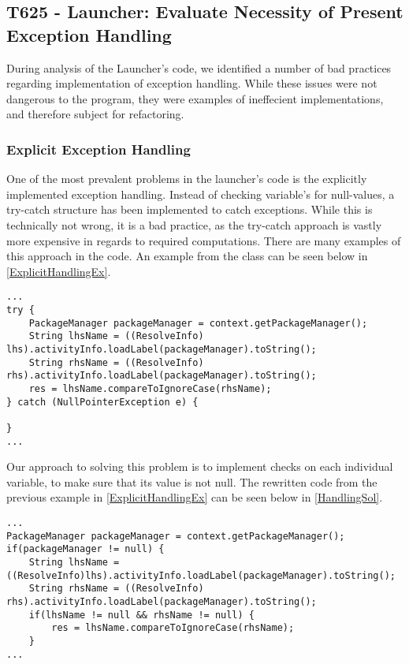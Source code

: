 \subsection{T625 - Launcher: Evaluate Necessity of Present Exception Handling}
During analysis of the Launcher's code, we identified a number of bad practices
regarding implementation of exception handling. While these issues were not
dangerous to the program, they were examples of ineffecient implementations, and
therefore subject for refactoring.

\subsubsection{Explicit Exception Handling}
One of the most prevalent problems in the launcher's code is the explicitly
implemented exception handling. Instead of checking variable's for
null-values, a try-catch structure has been implemented to catch exceptions.
While this is technically not wrong, it is a bad practice, as the try-catch
approach is vastly more expensive in regards to required computations. There are
many examples of this approach in the code. An example from the
 class can be seen below in
\autoref{ExplicitHandlingEx}.\nl

\begin{minipage}[H]{\linewidth}
\begin{lstlisting}[caption = An example of explicit exception handling., label = ExplicitHandlingEx] 
...
try {
	PackageManager packageManager = context.getPackageManager();
	String lhsName = ((ResolveInfo) lhs).activityInfo.loadLabel(packageManager).toString();
    String rhsName = ((ResolveInfo) rhs).activityInfo.loadLabel(packageManager).toString();
	res = lhsName.compareToIgnoreCase(rhsName);	
} catch (NullPointerException e) {

}
...
\end{lstlisting}
\end{minipage}

Our approach to solving this problem is to implement checks on each individual
variable, to make sure that its value is not null. The rewritten code from the
previous example in \autoref{ExplicitHandlingEx} can be seen below in
\autoref{HandlingSol}.\nl

\begin{minipage}[H]{\linewidth}
\begin{lstlisting}[caption = Our approach to variable checking., label = HandlingSol] 
...
PackageManager packageManager = context.getPackageManager();
if(packageManager != null) {
	String lhsName = ((ResolveInfo)lhs).activityInfo.loadLabel(packageManager).toString(); 
	String rhsName = ((ResolveInfo) rhs).activityInfo.loadLabel(packageManager).toString(); 
	if(lhsName != null && rhsName != null) {
    	res = lhsName.compareToIgnoreCase(rhsName);
    }
...
\end{lstlisting}
\end{minipage}

